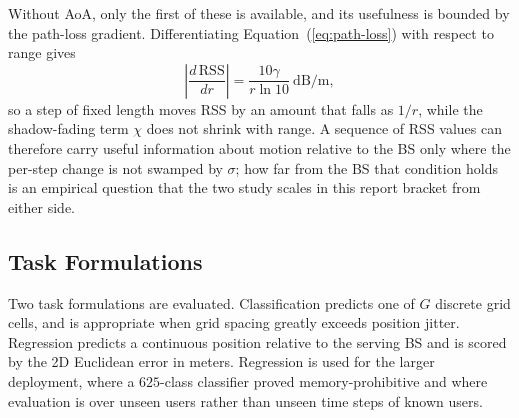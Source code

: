 Without AoA, only the first of these is available, and its usefulness is bounded by the path-loss gradient. Differentiating Equation~(\ref{eq:path-loss}) with respect to range gives
\begin{equation}
  \left\lvert \frac{d\,\mathrm{RSS}}{dr} \right\rvert = \frac{10\gamma}{r \ln 10}\ \text{dB/m},
  \label{eq:rss-gradient}
\end{equation}
so a step of fixed length moves RSS by an amount that falls as $1/r$, while the shadow-fading term $\chi$ does not shrink with range. A sequence of RSS values can therefore carry useful information about motion relative to the BS only where the per-step change is not swamped by $\sigma$; how far from the BS that condition holds is an empirical question that the two study scales in this report bracket from either side.

\subsection{Task Formulations}
\label{subsec:task-formulations}

Two task formulations are evaluated. Classification predicts one of $G$ discrete grid cells, and is appropriate when grid spacing greatly exceeds position jitter. Regression predicts a continuous position relative to the serving BS and is scored by the 2D Euclidean error in meters. Regression is used for the larger deployment, where a $625$-class classifier proved memory-prohibitive and where evaluation is over unseen users rather than unseen time steps of known users.
